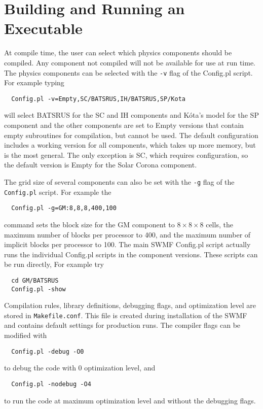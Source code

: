 \section{Building and Running an Executable}

At compile time, the user can select which physics components should be
compiled.  
Any component not compiled will not be available for
use at run time.  The physics components can be selected with the {\tt -v} flag
of the Config.pl script. For example typing
\begin{verbatim}
  Config.pl -v=Empty,SC/BATSRUS,IH/BATSRUS,SP/Kota
\end{verbatim}
will select BATSRUS for the SC and IH components and K\'ota's model for
the SP component and the other components are set to Empty versions
that contain empty subroutines for compilation, but cannot be used.
The default configuration includes a working version for all components, 
which takes up more memory, but is the most general.
The only exception is SC, which requires configuration, so the 
default version is Empty for the Solar Corona component.

The grid size of several components can also be set with the {\tt -g}
flag of the {\tt Config.pl} script. For example the 
\begin{verbatim}
  Config.pl -g=GM:8,8,8,400,100
\end{verbatim}
command sets the block size for the GM component to $8\times 8\times 8$ cells, 
the maximum number of blocks per processor to 400, 
and the maximum number of implicit blocks per processor to 100.
The main SWMF Config.pl script actually runs the individual Config.pl
scripts in the component versions. These scripts can be run directly,
For example try
\begin{verbatim}
  cd GM/BATSRUS
  Config.pl -show
\end{verbatim}
Compilation rules, library definitions, debugging flags, and optimization 
level are stored in {\tt Makefile.conf}. This file is created during
installation of the SWMF and contains default settings for production runs.
The compiler flags can be modified with
\begin{verbatim}
  Config.pl -debug -O0
\end{verbatim}
to debug the code with 0 optimization level, and
\begin{verbatim}
  Config.pl -nodebug -O4
\end{verbatim}
to run the code at maximum optimization level and without the debugging flags.


